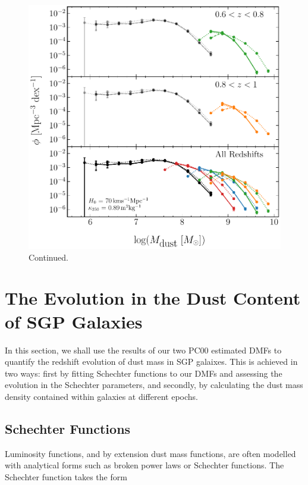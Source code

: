 \begin{figure}
    \ContinuedFloat
    \centering
    \includegraphics[width=\columnwidth]{Figures/Figure_3_4_part2.pdf}
    \caption{Continued.}
\end{figure}

\section{The Evolution in the Dust Content of SGP Galaxies}

In this section, we shall use the results of our two PC00 estimated DMFs to quantify the redshift evolution of dust mass in SGP galaixes. This is achieved in two ways: first by fitting Schechter functions to our DMFs and assessing the evolution in the Schechter parameters, and secondly, by calculating the dust mass density contained within galaxies at different epochs.

\subsection{Schechter Functions}
\label{sec:schechter_functions}

Luminosity functions, and by extension dust mass functions, are often modelled with analytical forms such as broken power laws or Schechter functions. The Schechter function takes the form

